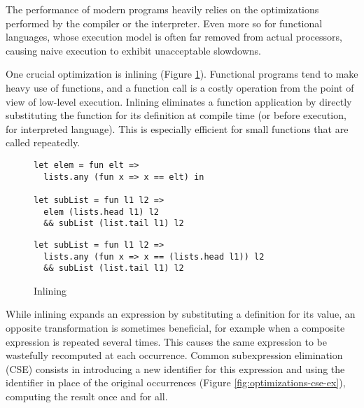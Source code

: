 \documentclass[sigplan,10pt,review,anonymous]{acmart}
\newcommand{\unsure}[2][1=]{}
\newcommand{\info}[2][1=]{}
\begin{document}
\unsure{I (Arnaud) changed the title of this subsection. Maybe it's
  not the best one, but if it is, then we ought to reorder the section
  a little bit to fit the modified narrative.}

The performance of modern programs heavily relies on the optimizations performed
by the compiler or the interpreter. Even more so for functional languages, whose
execution model is often far removed from actual processors, causing naive
execution to exhibit unacceptable slowdowns.

One crucial optimization is
inlining (Figure \ref{fig:optimizations-inlining-ex}). Functional programs tend
to make heavy use of functions, and a function call is a costly operation from
the point of view of low-level execution. Inlining eliminates a function
application by directly substituting the function for its definition at compile
time (or before execution, for interpreted language). This is especially
efficient for small functions that are called repeatedly.

\info{I think it's better to use [h] on figures, we can discuss it}
\begin{figure}[h]
  \begin{center}
\begin{lstlisting}[language=nickel,title={Source program}]
let elem = fun elt =>
  lists.any (fun x => x == elt) in

let subList = fun l1 l2 =>
  elem (lists.head l1) l2
  && subList (list.tail l1) l2
\end{lstlisting}
\begin{lstlisting}[language=nickel,title={Optimized program}]
let subList = fun l1 l2 =>
  lists.any (fun x => x == (lists.head l1)) l2
  && subList (list.tail l1) l2
\end{lstlisting}
  \end{center}
\caption{Inlining}
\label{fig:optimizations-inlining-ex}
\end{figure}

While inlining expands an expression by substituting a definition for its value,
an opposite transformation is sometimes beneficial, for example when a composite
expression is repeated several times. This causes the same expression to be
wastefully recomputed at each occurrence. Common subexpression elimination (CSE)
consists in introducing a new identifier for this expression and using the
identifier in place of the original occurrences
(Figure \ref{fig:optimizations-cse-ex}), computing the result once and for all.
\end{document}
